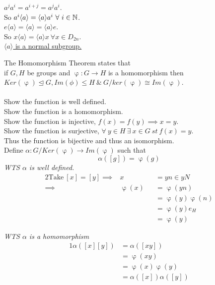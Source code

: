 \documentclass[11pt,a4paper]{article}
\begin{document}
\-\hspace{2em}$a^ja^i=a^{i+j}=a^ja^i$.\\
\-\hspace{2em}So $a^i\langle a \rangle = \langle a \rangle a^i\ \forall\ i \in \mathbb{N}$.\\

\-\hspace{2em}$e\langle a \rangle = \langle a \rangle = \langle a \rangle e$.\\

\-\hspace{2em}So $x\langle a \rangle = \langle a \rangle x\ \forall x \in D_{2n}$.\\
\-\hspace{2em}\underline{$\langle a \rangle$ is a normal subgroup.}\\


The Homomorphism Theorem states that \\
if $G, H$ be groups and $\upvarphi : G \to H$ is a homomorphism then $Ker(\upvarphi) \trianglelefteq G, Im(\phi) \leq H\ \&\ G / ker(\upvarphi) \cong Im(\upvarphi)$.\\\\

Show the function is well defined.\\
Show the function is a homomorphism.\\
Show the function is injective, $f(x) = f(y) \implies x = y$.\\
Show the function is surjective, $\forall\ y \in H\ \exists\ x \in G\ st\ f(x) = y$.\\
Thus the function is bijective and thus an isomorphism.\\


Define $\alpha : G/Ker(\upvarphi) \to Im(\upvarphi)$ such that
$$\alpha([g]) = \upvarphi(g)$$
\textit{WTS $\alpha$ is well defined.}\\
\begin{alignat*}{2}
  \mathrm{Take\ } [x] = [y] \implies& x &&= yn \in yN\\
  \implies& \upvarphi(x) &&= \upvarphi(yn)\\
  & &&= \upvarphi(y) \upvarphi(n)\\
  & &&= \upvarphi(y) e_H\\
  & &&= \upvarphi(y)
\end{alignat*}

\textit{WTS $\alpha$ is a homomorphism}
\begin{alignat*}{1}
  \alpha([x][y]) &= \alpha([xy])\\
  &= \upvarphi(xy)\\
  &= \upvarphi(x) \upvarphi(y)\\
  &= \alpha([x])\alpha([y])
\end{alignat*}
\end{document}
